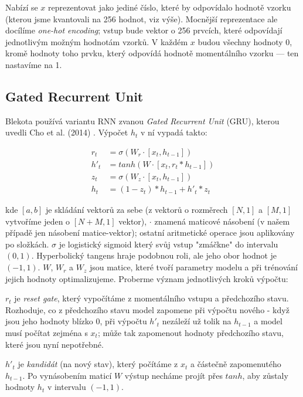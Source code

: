 \documentclass[a4]{article}
\begin{document}
Nabízí se $x$ reprezentovat jako jediné číslo, které by odpovídalo hodnotě vzorku (kterou jsme kvantovali na 256 hodnot, viz výše). Mocnější reprezentace ale docílíme \textit{one-hot encoding}; vstup bude vektor o 256 prvcích, které odpovídají jednotlivým možným hodnotám vzorků. V každém $x$ budou všechny hodnoty 0, kromě hodnoty toho prvku, který odpovídá hodnotě momentálního vzorku --- ten nastavíme na 1.

\subsection{Gated Recurrent Unit}

Blekota používá variantu RNN zvanou \textit{Gated Recurrent Unit} (GRU), kterou uvedli Cho et al. (2014) \cite{gru}. Výpočet $h_t$ v ní vypadá takto:

\begin{align*}
r_t &= \sigma(W_r \cdot [x_t, h_{t-1}]) \\
h'_t &= tanh(W \cdot [x_t, r_t * h_{t-1}]) \\
z_t &= \sigma(W_z \cdot [x_t, h_{t-1}]) \\
h_t &= (1 - z_t) * h_{t-1} + h'_t * z_t
\end{align*}

kde $[a, b]$ je skládání vektorů za sebe (z vektorů o rozměrech $[N,1]$ a $[M,1]$ vytvoříme jeden o $[N+M,1]$ vektor), $\cdot$ znamená maticové násobení (v našem případě jen násobení matice-vektor); ostatní aritmetické operace jsou aplikovány po složkách. $\sigma$ je logistický sigmoid
který svůj vstup "zmáčkne" do intervalu $(0, 1)$. Hyperbolický tangens hraje podobnou roli, ale jeho obor hodnot je $(-1, 1)$. $W$, $W_r$ a $W_z$ jsou matice, které tvoří parametry modelu a při trénování jejich hodnoty optimalizujeme. Proberme význam jednotlivých kroků výpočtu:

$r_t$ je \textit{reset gate}, který vypočítáme z momentálního vstupu a předchozího stavu. Rozhoduje, co z předchozího stavu model zapomene při výpočtu nového - když jsou jeho hodnoty blízko 0, při výpočtu $h'_t$ nezáleží už tolik na $h_{t-1}$ a model musí počítat zejména s $x_t$; může tak zapomenout hodnoty předchozího stavu, které jsou nyní nepotřebné.

$h'_t$ je \textit{kandidát} (na nový stav), který počítáme z $x_t$ a částečně zapomenutého $h_{t-1}$. Po vynásobením maticí $W$ výstup necháme projít přes $tanh$, aby zůstaly hodnoty $h_t$ v intervalu $(-1, 1)$.
\end{document}
